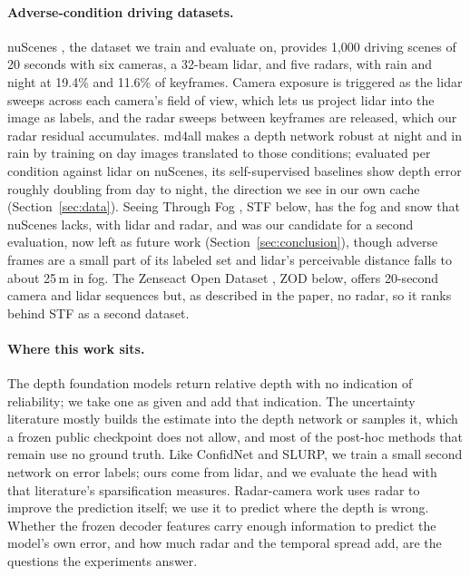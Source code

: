 \paragraph{Adverse-condition driving datasets.}
nuScenes \citep{caesar2020nuscenes}, the dataset we train and evaluate on, provides 1,000 driving scenes of 20 seconds with six cameras, a 32-beam lidar, and five radars, with rain and night at 19.4\% and 11.6\% of keyframes. Camera exposure is triggered as the lidar sweeps across each camera's field of view, which lets us project lidar into the image as labels, and the radar sweeps between keyframes are released, which our radar residual accumulates. md4all \citep{gasperini2023md4all} makes a depth network robust at night and in rain by training on day images translated to those conditions; evaluated per condition against lidar on nuScenes, its self-supervised baselines show depth error roughly doubling from day to night, the direction we see in our own cache (Section~\ref{sec:data}).
Seeing Through Fog \citep{bijelic2020seeing}, STF below, has the fog and snow that nuScenes lacks, with lidar and radar, and was our candidate for a second evaluation, now left as future work (Section~\ref{sec:conclusion}), though adverse frames are a small part of its labeled set and lidar's perceivable distance falls to about 25\,m in fog.
The Zenseact Open Dataset \citep{alibeigi2023zod}, ZOD below, offers 20-second camera and lidar sequences but, as described in the paper, no radar, so it ranks behind STF as a second dataset.

\paragraph{Where this work sits.}
The depth foundation models return relative depth with no indication of reliability; we take one as given and add that indication. The uncertainty literature mostly builds the estimate into the depth network or samples it, which a frozen public checkpoint does not allow, and most of the post-hoc methods that remain use no ground truth. Like ConfidNet and SLURP, we train a small second network on error labels; ours come from lidar, and we evaluate the head with that literature's sparsification measures. Radar-camera work uses radar to improve the prediction itself; we use it to predict where the depth is wrong. Whether the frozen decoder features carry enough information to predict the model's own error, and how much radar and the temporal spread add, are the questions the experiments answer.
